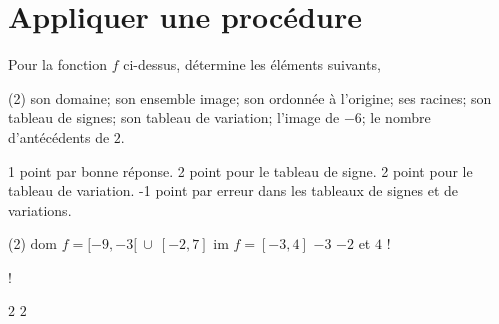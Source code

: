 \documentclass[a4paper, 12pt, parskip=half-]{scrartcl}
\begin{document}
\section*{ Appliquer une procédure}
\begin{exercise}[points=10]
    \begin{center}
        
    \end{center}
    Pour la fonction $f$ ci-dessus, détermine les éléments suivants,
    \begin{tasks}(2)
        \task son domaine;
        \task son ensemble image;
        \task son ordonnée à l'origine;
        \task ses racines;
        \task son tableau de signes;
        \task son tableau de variation;
        \task l'image de $-6$;
        \task le nombre d'antécédents de $2$.
    \end{tasks}
\end{exercise}
\begin{solution}
    1 point par bonne réponse.
    2 point pour le tableau de signe.
    2 point pour le tableau de variation.
    -1 point par erreur dans les tableaux de signes et de variations.
    \begin{tasks}(2)
        \task $\textrm{dom }f=[-9,-3[~\cup~[-2,7]$
        \task $\textrm{im }f=[-3,4]$
        \task $-3$
        \task $-2$ et $4$
        \task!
        \task!
        \task $2$
        \task $2$
    \end{tasks}
\end{solution}
\end{document}

